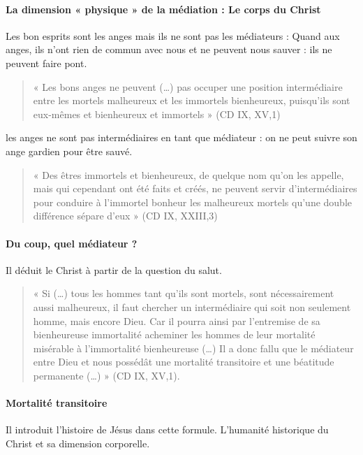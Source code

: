  \paragraph{La dimension « physique » de la médiation : Le corps du Christ } 
Les bon esprits sont les anges mais ils ne sont pas les médiateurs :
Quand aux anges, ils n'ont rien de commun avec nous et ne peuvent nous sauver : ils ne peuvent faire pont.
 

\begin{quote}
    « Les bons anges ne peuvent (…) pas occuper une position intermédiaire entre les mortels malheureux et les immortels bienheureux, puisqu’ils sont eux-mêmes et bienheureux et immortels » (CD IX, XV,1) 
\end{quote}

\begin{Synthesis}
les anges ne sont pas intermédiaires en tant que médiateur : on ne peut suivre son ange gardien pour être sauvé.
\end{Synthesis}

\begin{quote}
    « Des êtres immortels et bienheureux, de quelque nom qu’on les appelle, mais qui cependant ont été faits et créés, ne peuvent servir d’intermédiaires pour conduire à l’immortel bonheur les malheureux mortels qu’une double différence sépare d’eux » (CD IX, XXIII,3) 
\end{quote}

\paragraph{Du coup, quel médiateur ?} Il déduit le Christ à partir de la question du salut. 

\begin{quote}
    « Si (…) tous les hommes tant qu’ils sont mortels, sont nécessairement aussi malheureux, il faut chercher un intermédiaire qui soit non seulement homme, mais encore Dieu. Car il pourra ainsi par l’entremise de sa bienheureuse immortalité acheminer les hommes de leur mortalité misérable à l’immortalité bienheureuse (…) Il a donc fallu que le médiateur entre Dieu et nous possédât une mortalité transitoire et une béatitude permanente (…) » (CD  IX, XV,1). 
\end{quote}

\paragraph{Mortalité transitoire} Il introduit l'histoire de Jésus dans cette formule. L'humanité historique du Christ et sa dimension corporelle.
 
